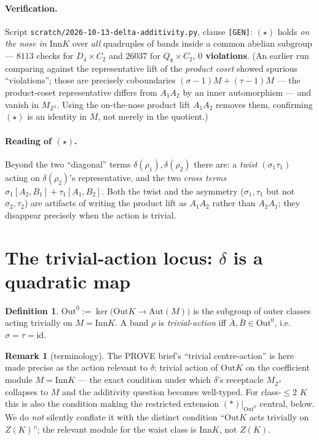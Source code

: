 \documentclass[11pt]{article}
\theoremstyle{definition}
\newtheorem{definition}[theorem]{Definition}
\newtheorem{remark}[theorem]{Remark}
\newcommand{\id}{\mathrm{id}}
\newcommand{\Z}{\mathbb{Z}}
\newcommand{\Aut}{\mathrm{Aut}}
\newcommand{\Inn}{\mathrm{Inn}}
\newcommand{\Out}{\mathrm{Out}}
\begin{document}
\paragraph{Verification.}
Script \texttt{scratch/2026-10-13-delta-additivity.py}, clause \texttt{[GEN]}:
$(\star)$ holds \emph{on the nose in $\Inn K$} over \emph{all} quadruples of bands
inside a common abelian subgroup --- $8113$ checks for $D_4\times C_2$ and $26037$ for
$Q_8\times C_2$, \textbf{$0$ violations}. (An earlier run comparing against the
representative lift of the \emph{product coset} showed spurious ``violations''; those
are precisely coboundaries $(\sigma-1)M+(\tau-1)M$ --- the product-coset representative
differs from $A_1A_2$ by an inner automorphism --- and vanish in $M_{\Z^2}$. Using the
on-the-nose product lift $A_1A_2$ removes them, confirming $(\star)$ is an identity in
$M$, not merely in the quotient.)

\paragraph{Reading of $(\star)$.}
Beyond the two ``diagonal'' terms $\delta(\rho_1),\delta(\rho_2)$ there are: a
\emph{twist} $(\sigma_1\tau_1)$ acting on $\delta(\rho_2)$'s representative, and the two
\emph{cross terms} $\sigma_1[A_2,B_1]+\tau_1[A_1,B_2]$. Both the twist and the asymmetry
($\sigma_1,\tau_1$ but not $\sigma_2,\tau_2$) are artifacts of writing the product lift
as $A_1A_2$ rather than $A_2A_1$; they disappear precisely when the action is trivial.

\section{The trivial-action locus: \texorpdfstring{$\delta$}{delta} is a quadratic map}\label{sec:quadratic}

\begin{definition}\label{def:out0}
$\Out^0:=\ker\!\big(\Out K\to\Aut(M)\big)$ is the subgroup of outer classes acting
trivially on $M=\Inn K$. A band $\rho$ is \emph{trivial-action} iff
$\bar A,\bar B\in\Out^0$, i.e.\ $\sigma=\tau=\id$.
\end{definition}

\begin{remark}[terminology]
The PROVE brief's ``trivial centre-action'' is here made precise as the action relevant
to $\delta$: trivial action of $\Out K$ on the coefficient module $M=\Inn K$ --- the
exact condition under which $\delta$'s receptacle $M_{\Z^2}$ collapses to $M$ and the
additivity question becomes well-typed. For class-$\le2$ $K$ this is also the condition
making the restricted extension $(\ast)|_{\Out^0}$ central, below. We do \emph{not}
silently conflate it with the distinct condition ``$\Out K$ acts trivially on $Z(K)$'';
the relevant module for the waist class is $\Inn K$, not $Z(K)$.
\end{remark}
\end{document}
